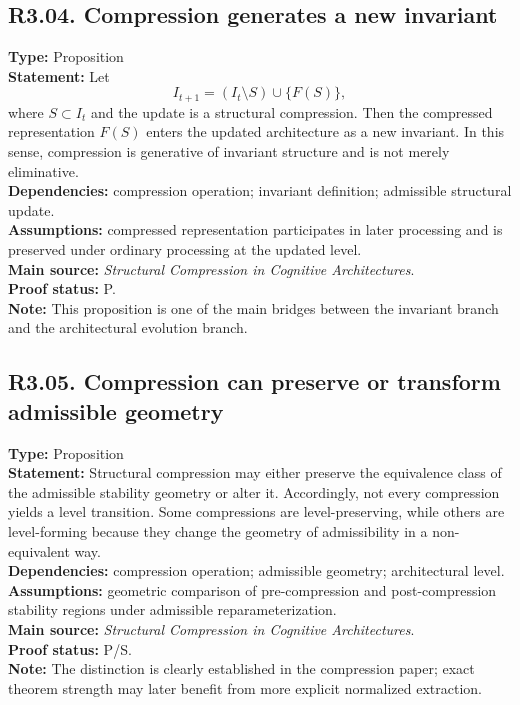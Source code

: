 \documentclass[12pt]{article}
\begin{document}
	\subsection*{R3.04. Compression generates a new invariant}
	\textbf{Type:} Proposition \\
	\textbf{Statement:} Let
	\[
	I_{t+1}=(I_t\setminus S)\cup\{F(S)\},
	\]
	where $S\subset I_t$ and the update is a structural compression. Then the compressed
	representation $F(S)$ enters the updated architecture as a new invariant. In this sense,
	compression is generative of invariant structure and is not merely eliminative. \\
	\textbf{Dependencies:} compression operation; invariant definition; admissible structural update. \\
	\textbf{Assumptions:} compressed representation participates in later processing and is
	preserved under ordinary processing at the updated level. \\
	\textbf{Main source:} \emph{Structural Compression in Cognitive Architectures}. \\
	\textbf{Proof status:} P. \\
	\textbf{Note:} This proposition is one of the main bridges between the invariant branch and the
	architectural evolution branch.
	
	\subsection*{R3.05. Compression can preserve or transform admissible geometry}
	\textbf{Type:} Proposition \\
	\textbf{Statement:} Structural compression may either preserve the equivalence class of the
	admissible stability geometry or alter it. Accordingly, not every compression yields a level
	transition. Some compressions are level-preserving, while others are level-forming because they
	change the geometry of admissibility in a non-equivalent way. \\
	\textbf{Dependencies:} compression operation; admissible geometry; architectural level. \\
	\textbf{Assumptions:} geometric comparison of pre-compression and post-compression stability
	regions under admissible reparameterization. \\
	\textbf{Main source:} \emph{Structural Compression in Cognitive Architectures}. \\
	\textbf{Proof status:} P/S. \\
	\textbf{Note:} The distinction is clearly established in the compression paper; exact theorem
	strength may later benefit from more explicit normalized extraction.
	
\end{document}
